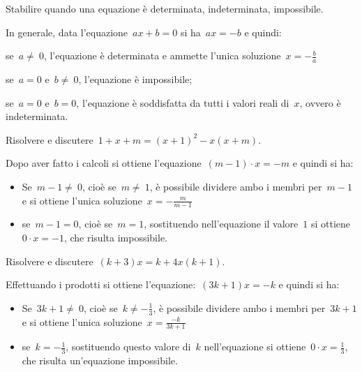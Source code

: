 \begin{procedura}{}{}
Stabilire quando una equazione è determinata, indeterminata, impossibile.

In generale, data l'equazione~\(ax+b=0\) si ha~\(ax=-b\) e quindi:
\begin{enumeratea}
\item se~\(a\neq~0\), l'equazione è determinata e ammette l'unica 
soluzione~\(x=-\frac{b}{a}\)
\item se~\(a=0\) e~\(b\neq~0\), l'equazione è impossibile;
\item se~\(a=0\) e~\(b=0\), l'equazione è soddisfatta da tutti i valori reali 
di~\(x\), ovvero è indeterminata.
\end{enumeratea}
\end{procedura}


 \begin{esempio}{}{}
Risolvere e discutere~\(1+x+m=(x+1)^{2}-x(x+m)\).

Dopo aver fatto i calcoli si ottiene l'equazione~\((m-1)\cdot x=-m\) e quindi 
si ha:
\begin{itemize}[nosep]
 \item Se~\(m-1\neq~0\), cioè se~\(m\neq~1\), è possibile dividere ambo i 
membri 
 per~\(m-1\) e si ottiene l'unica soluzione~\(x=-{\frac{m}{m-1}}\)
 \item se~\(m-1=0\), cioè se~\(m=1\), sostituendo nell'equazione il 
valore~\(1\) si 
 ottiene~\(0\cdot x=-1\), che risulta impossibile.
\end{itemize}
 \end{esempio}

 \begin{esempio}{}{}
Risolvere e discutere~\((k+3)x=k+4x(k+1)\).

Effettuando i prodotti si ottiene l'equazione:~\((3k+1)x=-k\) e quindi si ha:
\begin{itemize}[nosep]
 \item Se~\(3k+1\neq~0\), cioè se~\(k\neq -{\frac{1}{3}}\), è possibile 
dividere 
 ambo i membri per~\(3k+1\) e si ottiene l'unica 
soluzione~\(x=\frac{-k}{3k+1}\)
 \item se~\(k=-{\frac{1}{3}}\), sostituendo questo valore di~\(k\) 
nell'equazione 
 si ottiene~\(0\cdot x=\frac{1}{3}\), che risulta un'equazione impossibile.
\end{itemize}
 \end{esempio}

